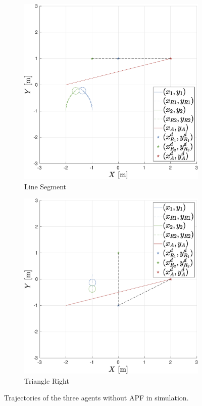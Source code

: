\documentclass{ifacconf}
\begin{document}
\begin{figure}
\begin{subfigure}[b]{0.32\columnwidth}
        \includegraphics[width=\linewidth]{images/simulations/wo_APF/2nd_scenario_wo.eps}
        \caption{Line Segment}
         \label{fig:sim_woAPF_noNoise_2}
    \end{subfigure}
    \begin{subfigure}[b]{0.32\columnwidth}
        \centering
        \includegraphics[width=\linewidth]{images/simulations/wo_APF/3rd_scenario_wo.eps}
        \caption{Triangle Right}
         \label{fig:sim_woAPF_noNoise_3}
    \end{subfigure}
    \vspace{-0.2cm}
    \caption{Trajectories of the three agents without APF in simulation.}
    \label{fig:sim_woAPF_noNoise}
\end{figure}
\end{document}

